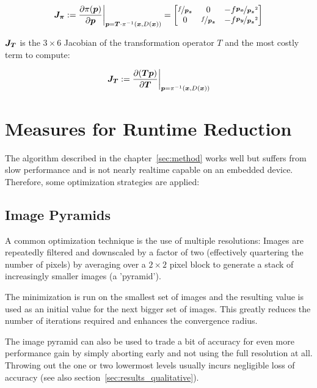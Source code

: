 \begin{equation}
    \mat{J_{\pi}} := \frac{\partial \pi(\vec{p})}{\partial \vec{p}}
    \bigg|_{\vec{p} = \vec{T}\cdot\pi^{-1}(\vec{x},D(\vec{x}))}
    =
    \begin{bmatrix}
        \nicefrac{f}{\vec{p_z}} & 0 & -f \nicefrac{\vec{p_x}}{\vec{p_z}^2} \\
        0 & \nicefrac{f}{\vec{p_z}} & -f \nicefrac{\vec{p_y}}{\vec{p_z}^2}
    \end{bmatrix}
\end{equation}

$\mat{J_T}$ is the $3 \times 6$ Jacobian of the transformation operator $T$ and
the most costly term to compute:

\begin{equation}
    \mat{J_T} := \frac{\partial (\vec{T} \vec{p})}{\partial \vec{T}}
    \bigg|_{\vec{p} = \pi^{-1}(\vec{x}, D(\vec{x}))}
\end{equation}




\section{Measures for Runtime Reduction}
\label{sec:optimizations}

The algorithm described in the chapter~\ref{sec:method} works well but suffers from
slow performance and is not nearly realtime capable on an embedded device.
Therefore, some optimization strategies are applied:

\subsection{Image Pyramids}
\label{sec:pyramids}

A common optimization technique is the use of multiple resolutions: Images are
repeatedly filtered and downscaled by a factor of two (effectively quartering
the number of pixels) by averaging over a $2 \times 2$ pixel block to generate
a stack of increasingly smaller images (a 'pyramid').

The minimization is run on the smallest set of images and the resulting value
is used as an initial value for the next bigger set of images.
This greatly reduces the number of iterations required and enhances the
convergence radius.

The image pyramid can also be used to trade a bit of accuracy for even more
performance gain by simply aborting early and not using the full resolution at
all. Throwing out the one or two lowermost levels usually incurs negligible
loss of accuracy (see also section~\ref{sec:results_qualitative}).


